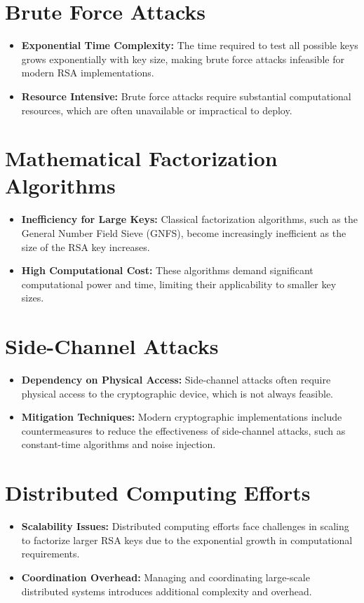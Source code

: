 \documentclass[12pt,a4paper]{report}
\begin{document}
\section{Brute Force Attacks}
\begin{itemize}
    \item \textbf{Exponential Time Complexity:} The time required to test all possible keys grows exponentially with key size, making brute force attacks infeasible for modern RSA implementations.
    \item \textbf{Resource Intensive:} Brute force attacks require substantial computational resources, which are often unavailable or impractical to deploy.
\end{itemize}

\section{Mathematical Factorization Algorithms}
\begin{itemize}
    \item \textbf{Inefficiency for Large Keys:} Classical factorization algorithms, such as the General Number Field Sieve (GNFS), become increasingly inefficient as the size of the RSA key increases.
    \item \textbf{High Computational Cost:} These algorithms demand significant computational power and time, limiting their applicability to smaller key sizes.
\end{itemize}

\section{Side-Channel Attacks}
\begin{itemize}
    \item \textbf{Dependency on Physical Access:} Side-channel attacks often require physical access to the cryptographic device, which is not always feasible.
    \item \textbf{Mitigation Techniques:} Modern cryptographic implementations include countermeasures to reduce the effectiveness of side-channel attacks, such as constant-time algorithms and noise injection.
\end{itemize}

\section{Distributed Computing Efforts}
\begin{itemize}
    \item \textbf{Scalability Issues:} Distributed computing efforts face challenges in scaling to factorize larger RSA keys due to the exponential growth in computational requirements.
    \item \textbf{Coordination Overhead:} Managing and coordinating large-scale distributed systems introduces additional complexity and overhead.
\end{itemize}
\end{document}
